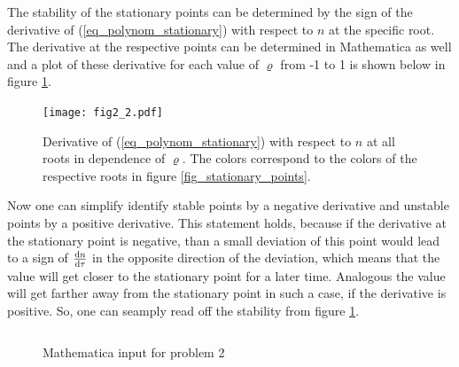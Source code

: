 \documentclass[12pt, a4paper]{article}
\begin{document}
  The stability of the stationary points can be determined by the sign of the derivative of (\ref{eq_polynom_stationary}) with respect to $n$ at the specific root. The derivative at the respective points can be determined in Mathematica as well and a plot of these derivative for each value of $\varrho$ from -1 to 1 is shown below in figure \ref{fig_stationary_points_stability}.

  \begin{figure}[h]
    \centering
    \texttt{[image: fig2\_2.pdf]}
    \caption{Derivative of (\ref{eq_polynom_stationary}) with respect to $n$ at all roots in dependence of $\varrho$. The colors correspond to the colors of the respective roots in figure \ref{fig_stationary_points}.}
    \label{fig_stationary_points_stability}
  \end{figure}

  \newpage
  Now one can simplify identify stable points by a negative derivative and unstable points by a positive derivative. This statement holds, because if the derivative at the stationary point is negative, than a small deviation of this point would lead to a sign of $\frac{{\rm d} n}{{\rm d} \tau}$ \glqq in the opposite direction\grqq{} of the deviation, which means that the value will get closer to the stationary point for a later time. Analogous the value will get farther away from the stationary point in such a case, if the derivative is positive. So, one can seamply read off the stability from figure \ref{fig_stationary_points_stability}.
  \vspace{\baselineskip}
  
  \begin{figure}[h]
    \centering
    \captionsetup{type=listing}
    \inputminted{Mathematica}{problem2.txt}
    \caption{Mathematica input for problem 2}
  \end{figure}
  
\end{document}

